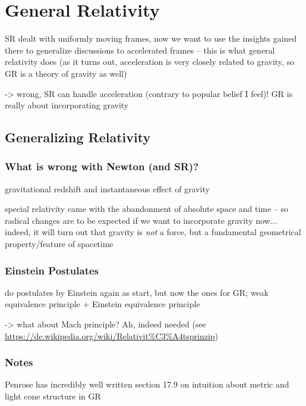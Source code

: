 




\chapter{General Relativity}

SR dealt with uniformly moving frames, now we want to use the insights gained there to generalize discussions to accelerated frames -- this is what general relativity does (as it turns out, acceleration is very closely related to gravity, so GR is a theory of gravity as well)

-> wrong, SR can handle acceleration (contrary to popular belief I feel)! GR is really about incorporating gravity




	\section{Generalizing Relativity}
		\subsection{What is wrong with Newton (and SR)?}
gravitational redshift and instantaneous effect of gravity



special relativity came with the abandonment of absolute space and time -- so radical changes are to be expected if we want to incorporate gravity now... indeed, it will turn out that gravity is \emph{not} a force, but a fundamental geometrical property/feature of spacetime



		\subsection{Einstein Postulates}
do postulates by Einstein again as start, but now the ones for GR; weak equivalence principle + Einstein equivalence principle

-> what about Mach principle? Ah, indeed needed (see \url{https://de.wikipedia.org/wiki/Relativit%C3%A4tsprinzip})


		\subsection{Notes}
Penrose has incredibly well written section 17.9 on intuition about metric and light cone structure in GR


